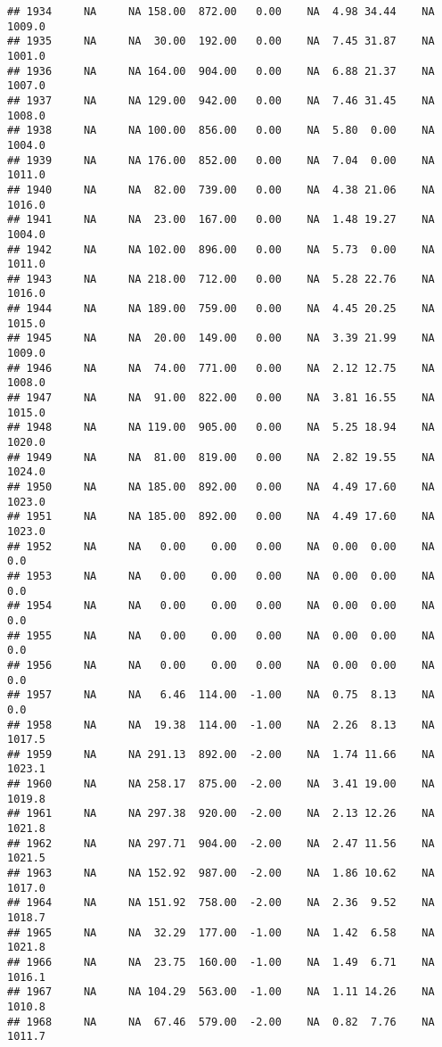 \documentclass{article}\usepackage{graphicx, color}
\makeatletter
\newenvironment{kframe}{%
 \def\at@end@of@kframe{}%
 \ifinner\ifhmode%
  \def\at@end@of@kframe{\end{minipage}}%
  \begin{minipage}{\columnwidth}%
 \fi\fi%
 \def\FrameCommand##1{\hskip\@totalleftmargin \hskip-\fboxsep
 \colorbox{shadecolor}{##1}\hskip-\fboxsep
     \hskip-\linewidth \hskip-\@totalleftmargin \hskip\columnwidth}%
 \MakeFramed {\advance\hsize-\width
   \@totalleftmargin\z@ \linewidth\hsize
   \@setminipage}}%
 {\par\unskip\endMakeFramed%
 \at@end@of@kframe}
\newenvironment{knitrout}{}{} %
\makeatother
\begin{document}
\begin{knitrout}
\begin{kframe}
\begin{verbatim}
## 1934     NA     NA 158.00  872.00   0.00    NA  4.98 34.44    NA 1009.0
## 1935     NA     NA  30.00  192.00   0.00    NA  7.45 31.87    NA 1001.0
## 1936     NA     NA 164.00  904.00   0.00    NA  6.88 21.37    NA 1007.0
## 1937     NA     NA 129.00  942.00   0.00    NA  7.46 31.45    NA 1008.0
## 1938     NA     NA 100.00  856.00   0.00    NA  5.80  0.00    NA 1004.0
## 1939     NA     NA 176.00  852.00   0.00    NA  7.04  0.00    NA 1011.0
## 1940     NA     NA  82.00  739.00   0.00    NA  4.38 21.06    NA 1016.0
## 1941     NA     NA  23.00  167.00   0.00    NA  1.48 19.27    NA 1004.0
## 1942     NA     NA 102.00  896.00   0.00    NA  5.73  0.00    NA 1011.0
## 1943     NA     NA 218.00  712.00   0.00    NA  5.28 22.76    NA 1016.0
## 1944     NA     NA 189.00  759.00   0.00    NA  4.45 20.25    NA 1015.0
## 1945     NA     NA  20.00  149.00   0.00    NA  3.39 21.99    NA 1009.0
## 1946     NA     NA  74.00  771.00   0.00    NA  2.12 12.75    NA 1008.0
## 1947     NA     NA  91.00  822.00   0.00    NA  3.81 16.55    NA 1015.0
## 1948     NA     NA 119.00  905.00   0.00    NA  5.25 18.94    NA 1020.0
## 1949     NA     NA  81.00  819.00   0.00    NA  2.82 19.55    NA 1024.0
## 1950     NA     NA 185.00  892.00   0.00    NA  4.49 17.60    NA 1023.0
## 1951     NA     NA 185.00  892.00   0.00    NA  4.49 17.60    NA 1023.0
## 1952     NA     NA   0.00    0.00   0.00    NA  0.00  0.00    NA    0.0
## 1953     NA     NA   0.00    0.00   0.00    NA  0.00  0.00    NA    0.0
## 1954     NA     NA   0.00    0.00   0.00    NA  0.00  0.00    NA    0.0
## 1955     NA     NA   0.00    0.00   0.00    NA  0.00  0.00    NA    0.0
## 1956     NA     NA   0.00    0.00   0.00    NA  0.00  0.00    NA    0.0
## 1957     NA     NA   6.46  114.00  -1.00    NA  0.75  8.13    NA    0.0
## 1958     NA     NA  19.38  114.00  -1.00    NA  2.26  8.13    NA 1017.5
## 1959     NA     NA 291.13  892.00  -2.00    NA  1.74 11.66    NA 1023.1
## 1960     NA     NA 258.17  875.00  -2.00    NA  3.41 19.00    NA 1019.8
## 1961     NA     NA 297.38  920.00  -2.00    NA  2.13 12.26    NA 1021.8
## 1962     NA     NA 297.71  904.00  -2.00    NA  2.47 11.56    NA 1021.5
## 1963     NA     NA 152.92  987.00  -2.00    NA  1.86 10.62    NA 1017.0
## 1964     NA     NA 151.92  758.00  -2.00    NA  2.36  9.52    NA 1018.7
## 1965     NA     NA  32.29  177.00  -1.00    NA  1.42  6.58    NA 1021.8
## 1966     NA     NA  23.75  160.00  -1.00    NA  1.49  6.71    NA 1016.1
## 1967     NA     NA 104.29  563.00  -1.00    NA  1.11 14.26    NA 1010.8
## 1968     NA     NA  67.46  579.00  -2.00    NA  0.82  7.76    NA 1011.7

\end{verbatim}
\end{kframe}
\end{knitrout}
\end{document}
